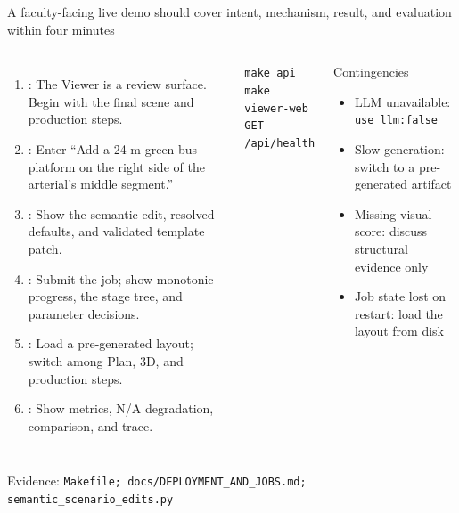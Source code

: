 \documentclass[aspectratio=169,10pt]{ctexbeamer}
\newcommand{\sourcefoot}[1]{\vfill{\tiny\color{hkustgrey}Evidence: \texttt{#1}}}
\begin{document}
\begin{frame}{A faculty-facing live demo should cover intent, mechanism, result, and evaluation within four minutes}
  \footnotesize
  \begin{columns}[T,onlytextwidth]
      \begin{enumerate}
        \item[\textbf{0:00}] : The Viewer is a review surface. Begin with the final scene and production steps.
        \item[\textbf{0:35}] : Enter “Add a 24 m green bus platform on the right side of the arterial's middle segment.”
        \item[\textbf{1:15}] : Show the semantic edit, resolved defaults, and validated template patch.
        \item[\textbf{1:55}] : Submit the job; show monotonic progress, the stage tree, and parameter decisions.
        \item[\textbf{2:40}] : Load a pre-generated layout; switch among Plan, 3D, and production steps.
        \item[\textbf{3:25}] : Show metrics, N/A degradation, comparison, and trace.
      \end{enumerate}
      \begin{callout}[Preflight]
        \texttt{make api}\\
        \texttt{make viewer-web}\\
        \texttt{GET /api/health}
      \end{callout}
      \tightgap
      \begin{exampleblock}{Contingencies}
        \begin{itemize}
          \item LLM unavailable: \texttt{use\_llm:false}
          \item Slow generation: switch to a pre-generated artifact
          \item Missing visual score: discuss structural evidence only
          \item Job state lost on restart: load the layout from disk
        \end{itemize}
      \end{exampleblock}
  \end{columns}
  \sourcefoot{Makefile; docs/DEPLOYMENT\_AND\_JOBS.md; semantic\_scenario\_edits.py}
\end{frame}
\end{document}
